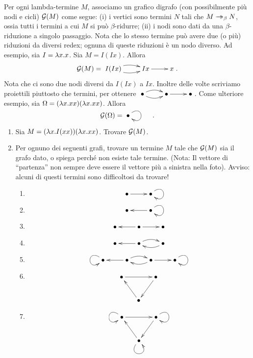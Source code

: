 \documentclass{article}
\begin{document}
\begin{exercise}
  Per ogni lambda-termine $M$, associamo un grafico digrafo (con
  possibilmente pi\`u nodi e cicli) ${\cal G}(M)$ come segue: (i) i
  vertici sono termini $N$ tali che $M\mathrel{\rightarrow\!\!\!\!\!\rightarrow}_{\beta} N$, ossia tutti i termini
  a cui $M$ si pu\`o $\beta$-ridurre; (ii) i nodi sono dati da una
  $\beta$-riduzione a singolo passaggio. Nota che lo stesso termine pu\`o
  avere due (o pi\`u) riduzioni da diversi redex; ognuna di queste
  riduzioni \`e un nodo diverso. Ad esempio, sia $I=\lambda x.x$. Sia
  $M=I(Ix)$. Allora
  \[ \sG(M)=\xymatrix{I(Ix)\ar@/^/[r]\ar@/_/[r]&Ix\ar[r]&x}.
  \]
  Nota che ci sono due nodi diversi da $I(Ix)$ a $Ix$.  Inoltre
  delle volte scriviamo proiettili piuttosto che termini, per ottenere $
  \xymatrix{\bullet\ar@/^/[r]\ar@/_/[r]&\bullet\ar[r]&\bullet}$.  Come
  ulteriore esempio, sia $\Omega=(\lambda x.xx)(\lambda x.xx)$. Allora
  \[ \sG(\Omega) = \xymatrix{\bullet\ar@(ur,dr)[]&}.
  \]
  \begin{enumerate}
  \item[(a)] Sia $M=(\lambda x.I(xx))(\lambda x.xx)$. Trovare ${\cal G}(M)$.
  \item[(b)] Per ognuno dei seguenti grafi, trovare un termine $M$ tale
  che ${\cal G}(M)$ sia il grafo dato, o spiega perch\'e non esiste
  tale termine. (Nota: Il vettore di ``partenza'' non sempre deve essere
  il vettore pi\`u a sinistra nella foto). Avviso: alcuni di questi termini
  sono difficoltosi da trovare!
    \begin{enumerate}
    \item[(i)] \[ \xymatrix{\bullet\ar[r]&\bullet\ar@(ur,dr)[]} \]
    \item[(ii)] \[ \xymatrix{\bullet&\bullet\ar@(ur,dr)[]\ar[l]} \]
    \item[(iii)] \[ \xymatrix{\bullet&\bullet\ar[r]\ar[l]&\bullet} \]
    \item[(iv)] \[ \xymatrix{\bullet&\bullet\ar[l]\ar@/^/[r]&\bullet\ar@/^/[l]} \]
    \item[(v)] \[ \xymatrix{\bullet\ar@(ul,dl)[]&\bullet\ar@/^/[r]\ar[l]&\bullet\ar[r]\ar@/^/[l]&\bullet\ar@(ur,dr)[]} \]
    \item[(vi)] \[ \xymatrix@C-1em{\bullet\ar[rr]&&\bullet\ar[dl]\\&\bullet\ar[ul]}
      \]
    \item[(vii)] \[
      \xymatrix@C-1em{\bullet\ar@(ul,dl)[]\ar[rr]&&\bullet\ar@(ur,dr)[]\ar[dl]\\&\bullet\ar@(dl,dr)[]\ar[ul]}
      \]
    \end{enumerate}
  \end{enumerate}
\end{exercise}
\end{document}
